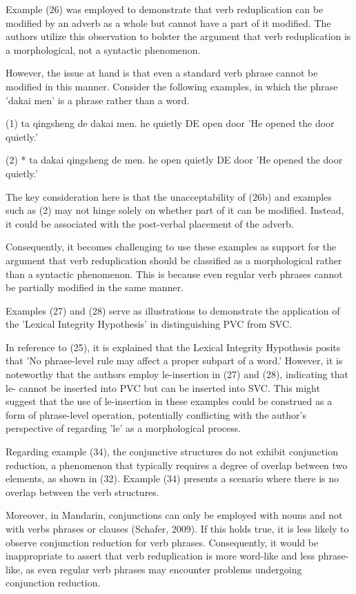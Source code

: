 \documentclass[fleqn,twoside]{article}
\begin{document}
\begin{enumerate}
Example (26) was employed to demonstrate that verb reduplication can be modified by an adverb as a whole but cannot have a part of it modified. The authors utilize this observation to bolster the argument that verb reduplication is a morphological, not a syntactic phenomenon.

However, the issue at hand is that even a standard verb phrase cannot be modified in this manner. Consider the following examples, in which the phrase 'dakai men' is a phrase rather than a word.

(1) ta qingsheng de dakai men.
       he  quietly    DE open door
      'He opened the door quietly.'

(2) * ta dakai qingsheng de men.
         he open quietly       DE door
         'He opened the door quietly.'

The key consideration here is that the unacceptability of (26b) and examples such as (2) may not hinge solely on whether part of it can be modified. Instead, it could be associated with the post-verbal placement of the adverb.

Consequently, it becomes challenging to use these examples as support for the argument that verb reduplication should be classified as a morphological rather than a syntactic phenomenon. This is because even regular verb phrases cannot be partially modified in the same manner.


Examples (27) and (28) serve as illustrations to demonstrate the application of the 'Lexical Integrity Hypothesis' in distinguishing PVC from SVC.

In reference to (25), it is explained that the Lexical Integrity Hypothesis posits that 'No
phrase-level rule may affect a proper subpart of a word.' However, it is noteworthy that the authors
employ le-insertion in (27) and (28), indicating that le- cannot be inserted into PVC but can be
inserted into SVC. This might suggest that the use of le-insertion in these examples could be
construed as a form of phrase-level operation, potentially conflicting with the author's perspective
of regarding 'le' as a morphological process.

Regarding example (34), the conjunctive structures do not exhibit conjunction reduction, a phenomenon that typically requires a degree of overlap between two elements, as shown in (32). Example (34) presents a scenario where there is no overlap between the verb structures.

Moreover, in Mandarin, conjunctions can only be employed with nouns and not with verbs phrases or
clauses (Schafer, 2009). If this holds true, it is less likely to observe conjunction reduction for
verb phrases. Consequently, it would be inappropriate to assert that verb reduplication is more
word-like and less phrase-like, as even regular verb phrases may encounter problems undergoing
conjunction reduction.





\end{enumerate}
\end{document}
